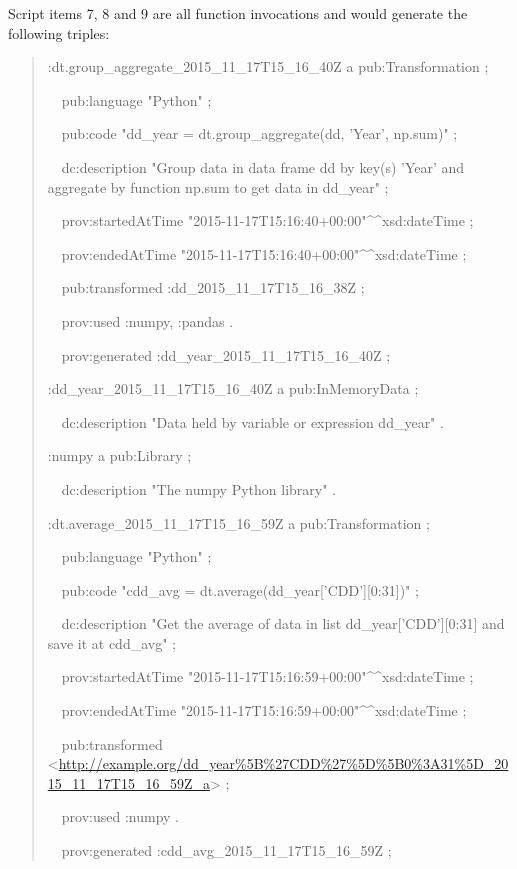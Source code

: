 Script items 7, 8 and 9 are all function invocations and would generate the following triples:
\begin{quotation}
	\noindent:dt.group\_aggregate\_2015\_11\_17T15\_16\_40Z a pub:Transformation ;
	
	\noindent\ \ pub:language "Python" ;
	
	\noindent\ \ pub:code "dd\_year = dt.group\_aggregate(dd, 'Year', np.sum)" ;
	
	\noindent\ \ dc:description "Group data in data frame dd by key(s) 'Year' and aggregate by function np.sum to get data in dd\_year" ;
	
	\noindent\ \ prov:startedAtTime "2015-11-17T15:16:40+00:00"\^{}\^{}xsd:dateTime ;
	
	\noindent\ \ prov:endedAtTime "2015-11-17T15:16:40+00:00"\^{}\^{}xsd:dateTime ;
	
	\noindent\ \ pub:transformed :dd\_2015\_11\_17T15\_16\_38Z ;
	
	\noindent\ \ prov:used :numpy, :pandas .
	
	\noindent\ \ prov:generated :dd\_year\_2015\_11\_17T15\_16\_40Z ;
	
	\noindent:dd\_year\_2015\_11\_17T15\_16\_40Z a pub:InMemoryData ;
	
	\noindent\ \ dc:description "Data held by variable or expression dd\_year" .
	
	\noindent:numpy a pub:Library ;
	
	\noindent\ \ dc:description "The numpy Python library" .
	
	\noindent:dt.average\_2015\_11\_17T15\_16\_59Z a pub:Transformation ;
	
	\noindent\ \ pub:language "Python" ;
	
	\noindent\ \ pub:code "cdd\_avg = dt.average(dd\_year['CDD'][0:31])" ;
	
	\noindent\ \ dc:description "Get the average of data in list dd\_year['CDD'][0:31] and save it at cdd\_avg" ;
	
	\noindent\ \ prov:startedAtTime "2015-11-17T15:16:59+00:00"\^{}\^{}xsd:dateTime ;
	
	\noindent\ \ prov:endedAtTime "2015-11-17T15:16:59+00:00"\^{}\^{}xsd:dateTime ;
	
	\noindent\ \ pub:transformed <\url{http://example.org/dd_year%5B%27CDD%27%5D%5B0%3A31%5D_2015_11_17T15_16_59Z_a}> ;
		
	\noindent\ \ prov:used :numpy .
	
	\noindent\ \ prov:generated :cdd\_avg\_2015\_11\_17T15\_16\_59Z ;
	

\end{quotation}
